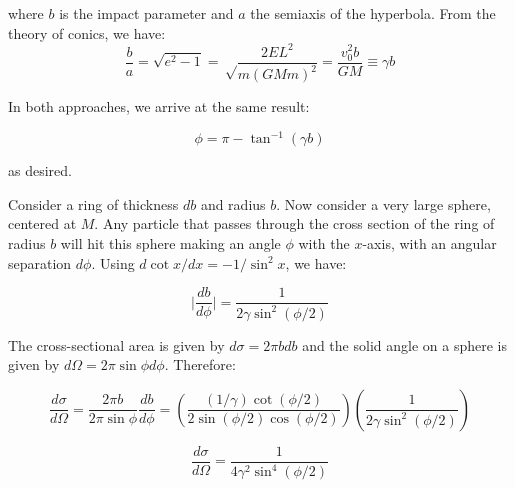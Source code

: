 \documentclass[11pt]{article}
\begin{document}
\begin{pproblem}
\begin{pssolution*}{}{}
\begin{alternativas}
            where \(b\) is the impact parameter and \(a\) the semiaxis of the hyperbola. From the theory of conics, we have:
            \[\frac{b}{a} = \sqrt{e^2-1} = \sqrt\frac{2EL^2}{m(GMm)^2} = \frac{v_0^2b}{GM} \equiv \gamma b\]

            In both approaches, we arrive at the same result:

            \[\boxed{\phi = \pi - \tan^{-1}(\gamma b)}\]

            as desired.

            \item Consider a ring of thickness \(db\) and radius \(b\). Now consider a very large sphere, centered at \(M\). Any particle that passes through the cross section of the ring of radius \(b\) will hit this sphere making an angle \(\phi\) with the \(x\)-axis, with an angular separation \(d\phi\). Using \(d\cot x/dx = -1/\sin^2x\), we have:
            
            \[\big|\frac{db}{d\phi}\big| = \frac{1}{2\gamma \sin^2(\phi/2)}\]

            The cross-sectional area is given by \(d\sigma = 2\pi bdb\) and the solid angle on a sphere is given by \(d\Omega = 2\pi \sin\phi d\phi\). Therefore:

            \[\frac{d\sigma}{d\Omega} = \frac{2\pi b}{2\pi \sin \phi}\frac{db}{d\phi} = \left(\frac{(1/\gamma)\cot(\phi/2)}{2\sin(\phi/2)\cos(\phi/2)}\right)\left(\frac{1}{2\gamma\sin^2(\phi/2)}\right)\]

            \[\boxed{\frac{d\sigma}{d\Omega} = \frac{1}{4\gamma^2\sin^4(\phi/2)}}\]
        \end{alternativas}            
    \end{pssolution*}
\end{pproblem}
\end{document}
